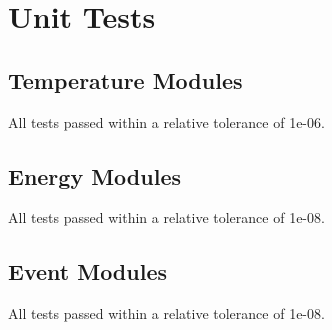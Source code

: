 \documentclass[12pt]{article}
\begin{document}
\section{Unit Tests}

\subsection{Temperature Modules}
All tests passed within a relative tolerance of 1e-06.

\subsection{Energy Modules}
All tests passed within a relative tolerance of 1e-08.

\subsection{Event Modules} 
All tests passed within a relative tolerance of 1e-08.
\end{document}
